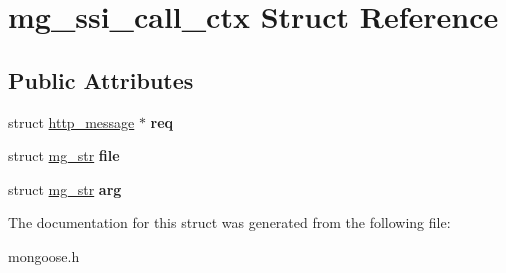 \hypertarget{structmg__ssi__call__ctx}{}\section{mg\+\_\+ssi\+\_\+call\+\_\+ctx Struct Reference}
\label{structmg__ssi__call__ctx}
\subsection*{Public Attributes}
\begin{DoxyCompactItemize}
\item 
\mbox{\label{structmg__ssi__call__ctx_ae4f6225598743855f1da5103a5640302}} 
struct \hyperlink{structhttp__message}{http\+\_\+message} $\ast$ {\bfseries req}
\item 
\mbox{\label{structmg__ssi__call__ctx_a87af9ab75f5b51b3c2237d20138dfda6}} 
struct \hyperlink{structmg__str}{mg\+\_\+str} {\bfseries file}
\item 
\mbox{\label{structmg__ssi__call__ctx_a203dc7c3db2fe470b099ed54e5a0bfbf}} 
struct \hyperlink{structmg__str}{mg\+\_\+str} {\bfseries arg}
\end{DoxyCompactItemize}


The documentation for this struct was generated from the following file\+:\begin{DoxyCompactItemize}
\item 
mongoose.\+h\end{DoxyCompactItemize}
